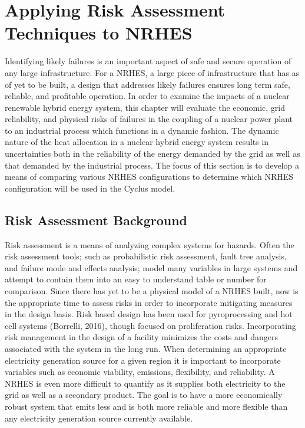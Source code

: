 \documentclass[12pt]{UIdahoMastersThesis}
\begin{document}
\chapter{Applying Risk Assessment Techniques to NRHES}
Identifying likely failures is an important aspect of safe and secure operation of any large infrastructure. For a NRHES, a large piece of infrastructure that has as of yet to be built, a design that addresses likely failures ensures long term safe, reliable, and profitable operation.   In order to examine the impacts of a nuclear renewable hybrid energy system, this chapter will evaluate the economic, grid reliability, and physical risks of failures in the coupling of a nuclear power plant to an industrial process which functions in a dynamic fashion. The dynamic nature of the heat allocation in a nuclear hybrid energy system results in uncertainties both in the reliability of the energy demanded by the grid as well as that demanded by the industrial process. The focus of this section is to develop a means of comparing various NRHES configurations to determine which NRHES configuration will be used in the Cyclus model. 
\section{Risk Assessment Background}
Risk assessment is a means of analyzing complex systems for hazards. Often the risk assessment tools; such as probabilistic risk assessment, fault tree analysis, and failure mode and effects analysis; model many variables in large systems and attempt to contain them into an easy to understand table or number for comparison. Since there has yet to be a physical model of a NRHES built, now is the appropriate time to assess risks in order to incorporate mitigating measures in the design basis. Risk based design has been used for pyroprocessing and hot cell systems (Borrelli, 2016), though focused on proliferation risks. Incorporating risk management in the design of a facility minimizes the costs and dangers associated with the system in the long run.
	When determining an appropriate electricity generation source for a given region it is important to incorporate variables such as economic viability, emissions, flexibility, and reliability. A NRHES is even more difficult to quantify as it supplies both electricity to the grid as well as a secondary product. The goal is to have a more economically robust system that emits less and is both more reliable and more flexible than any electricity generation source currently available. 
\end{document}
